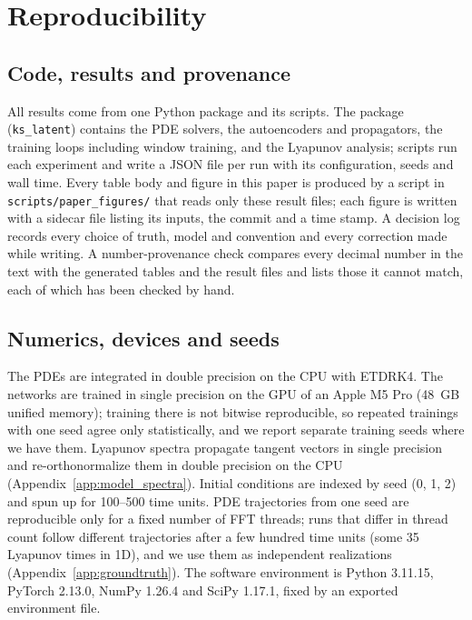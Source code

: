 \section{Reproducibility}
\label{app:reproducibility}

\subsection{Code, results and provenance}

All results come from one Python package and its scripts. The package
(\texttt{ks\_latent}) contains the PDE solvers, the autoencoders and
propagators, the training loops including window training, and the
Lyapunov analysis; scripts run each experiment and write
a JSON file per run with its configuration, seeds and wall time. Every
table body and figure in this paper is produced by a script in
\texttt{scripts/paper\_figures/} that reads only these result files; each
figure is written with a sidecar file listing its inputs, the commit and a
time stamp. A decision log records every choice of truth, model and
convention and every correction made while writing. A number-provenance
check compares every decimal number in the text with the generated
tables and the result files and lists those it cannot match, each of
which has been checked by hand.

\subsection{Numerics, devices and seeds}

The PDEs are integrated in double precision on the CPU with ETDRK4. The
networks are trained in single precision on the GPU of an Apple M5 Pro
(48~GB unified memory); training there is not bitwise reproducible, so
repeated trainings with one seed agree only statistically, and we report
separate training seeds where we have them. Lyapunov spectra propagate
tangent vectors in single precision and re-orthonormalize them in double
precision on the CPU (Appendix~\ref{app:model_spectra}). Initial conditions are
indexed by seed (0, 1, 2) and spun up for 100--500 time units. PDE
trajectories from one seed are reproducible only for a fixed number of
FFT threads; runs that differ in thread count follow different
trajectories after a few hundred time units (some 35 Lyapunov times in 1D),
and we use them as independent
realizations (Appendix~\ref{app:groundtruth}). The software environment
is Python 3.11.15, PyTorch 2.13.0, NumPy 1.26.4 and SciPy 1.17.1, fixed by
an exported environment file.

